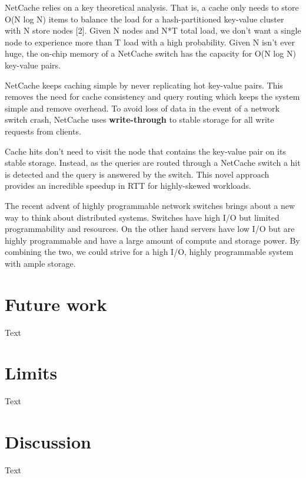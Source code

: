 \documentclass[11pt,twoside,twocolumn]{article}
\begin{document}
NetCache relies on a key theoretical analysis. That is, a cache only needs to store O(N log N) items to balance the load for a hash-partitioned key-value cluster with N store nodes [2]. Given N nodes and N*T total load, we don't want a single node to experience more than T load with a high probability. Given N isn't ever huge, the on-chip memory of a NetCache switch has the capacity for O(N log N) key-value pairs.

NetCache keeps caching simple by never replicating hot key-value pairs. This removes the need for cache consistency and query routing which keeps the system simple and remove overhead. To avoid loss of data in the event of a network switch crash, NetCache uses \textbf{write-through} to stable storage for all write requests from clients.

Cache hits don't need to visit the node that contains the key-value pair on its stable storage. Instead, as the queries are routed through a NetCache switch a hit is detected and the query is answered by the switch. This novel approach provides an incredible speedup in RTT for highly-skewed workloads.

The recent advent of highly programmable network switches brings about a new way to think about distributed systems. Switches have high I/O but limited programmability and resources. On the other hand servers have low I/O but are highly programmable and have a large amount of compute and storage power. By combining the two, we could strive for a high I/O, highly programmable system with ample storage.


\section*{Future work}

Text

\section*{Limits}

Text


\section*{Discussion}

Text
\end{document}
